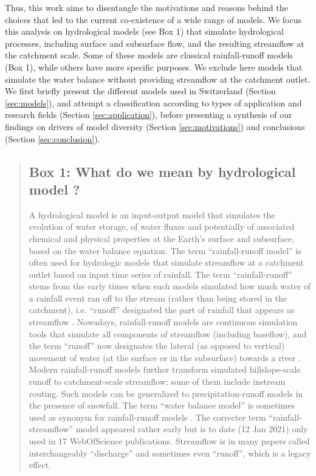 \documentclass[10pt,a4paper]{article}
\begin{document}
Thus, this work aims to disentangle the motivations and reasons behind
the choices that led to the current co-existence of a wide range of
models. We focus this analysis on hydrological models (see Box 1) that
simulate hydrological processes, including surface and subsurface flow,
and the resulting streamflow at the catchment scale. Some of these
models are classical rainfall-runoff models (Box 1), while others have
more specific purposes. We exclude here models that simulate the water
balance without providing streamflow at the catchment outlet. We first
briefly present the different models used in Switzerland
(Section \ref{sec:models}), and attempt a classification
according to types of application and research fields (Section
\ref{sec:application}), before presenting a synthesis of our
findings on drivers of model diversity
(Section \ref{sec:motivations}) and conclusions (Section \ref{sec:conclusion}).


\begin{quote}
\subsection*{Box 1: What do we mean by hydrological model ?}
\label{box:1}

A hydrological model is an input-output model that simulates the
evolution of water storage, of water fluxes and potentially of
associated chemical and physical properties at the Earth's surface and
subsurface, based on the water balance equation. The term
``rainfall-runoff model'' is often used for hydrologic models that
simulate streamflow at a catchment outlet based on input time series of
rainfall. The term ``rainfall-runoff'' stems from the early times when
such models simulated how much water of a rainfall event ran off to the
stream (rather than being stored in the catchment), i.e. ``runoff''
designated the part of rainfall that appears as
streamflow \citep{organization1992}. Nowadays, rainfall-runoff models are
continuous simulation tools that simulate all components of streamflow
(including baseflow), and the term ``runoff'' now designates the lateral
(as opposed to vertical) movement of water (at the surface or in the
subsurface) towards a river \citep{organization2012}. Modern rainfall-runoff
models further transform simulated hillslope-scale runoff to
catchment-scale streamflow; some of them include instream routing. Such
models can be generalized to precipitation-runoff models in the presence
of snowfall. The term ``water balance model'' is sometimes used as
synonym for rainfall-runoff models \citep{Boughton_2004} . The correcter
term ``rainfall-streamflow'' model appeared rather
early \citep{Young_1991} but is to date (12 Jan 2021) only used in 17
WebOfScience publications. Streamflow is in many papers called
interchangeably ``discharge'' and sometimes even ``runoff'', which is a
legacy effect. 
\end{quote}
\end{document}
